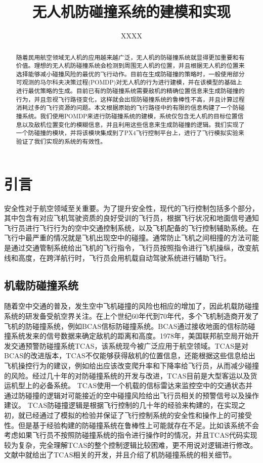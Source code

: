 \documentclass{article}
\title{无人机防碰撞系统的建模和实现}
\author{XXXX}
\begin{document}
\maketitle
\begin{abstract}
随着民用航空领域无人机的应用越来越广泛，无人机的防碰撞系统就显得更加重要和有价值。理想的无人机防碰撞系统会检测到周围无人机的位置，并且根据无人机的位置来选择能够减小碰撞风险的最优的飞行动作。目前在生成防碰撞的策略时，一般使用部分可观测的马尔科夫决策过程(POMDP)对无人机的行为进行建模，并在该模型的基础上进行最优策略的生成。目前已有的防碰撞系统需要敌机的精确位置信息来生成防碰撞的行为，并且忽视飞行路径变化，这样就会出现防碰撞系统的鲁棒性不高，并且计算过程消耗过多的飞行资源的问题。本文根据原始的飞行路径中的有限的信息构建了一个防碰撞系统。我们使用POMDP来进行防碰撞系统的建模，系统仅包含无人机的目标位置信息以及敌机位置变化的模糊信息，并且利用这些信息来生成防碰撞的逻辑。我们实现了一个防碰撞的模块，并将该模块集成到了PX4飞行控制平台上，进行了飞行模拟实验来验证了我们实现的系统的有效性。
\end{abstract}


\section{引言}

安全性对于航空领域至关重要。为了提升安全性，现代的飞行控制包括多个部分，其中包含有对应飞机驾驶资质的良好受训的飞行员，根据飞行状况和地面信号通知飞行员进行飞行行为的空中交通控制系统，以及飞机配备的飞行控制辅助系统。在飞行中最严重的情况就是飞机出现空中的碰撞。通常防止飞机之间相撞的方法可能是通过交通管制系统给出飞机的飞行指令，飞行员按照指令进行飞机操纵，改变航线和高度，在跨洋航行时，飞行员会用机载自动驾驶系统进行辅助飞行。

\subsection{机载防碰撞系统}
随着空中交通的普及，发生空中飞机碰撞的风险也相应的增加了，因此机载防碰撞系统的研发备受航空界关注。在上个世纪60年代到70年代，多个飞机制造商开发了飞机的防碰撞系统，例如BCAS信标防碰撞系统。BCAS通过接收地面的信标防碰撞系统发来的信号数据来确定敌机的距离和高度。1978年，美国联邦航空局开始开发交通预警防碰撞系统TCAS\cite{9,10}，该系统现今被广泛应用于航空领域。TCAS是对BCAS的改进版本，TCAS不仅能够获得敌机的位置信息，还能根据这些信息给出飞机操控行为的建议，例如给出应该改变爬升率和下降率给飞行员，从而减少碰撞的风险。经过几十年的对防碰撞系统的开发与改进，TCAS目前是大型客运以及货运机型上的必备系统。
TCAS使用一个机载的信标雷达来监控空中的交通状态并通过防碰撞的逻辑对可能接近的空中碰撞风险给出飞行员相关的预警信号以及操作建议。 TCAS防碰撞逻辑是根据飞行控制的几十年的经验来构建的，在实现之初，就已经通过了模拟的检验并保证了飞行控制系统的安全性和操作上的可接受性。但是基于经验构建的防碰撞系统在鲁棒性上可能就存在不足。比如该系统不会考虑如果飞行员不按照防碰撞系统的指令进行操作时的情况，并且TCAS代码实现较为复杂，完全理解TCAS的整个控制逻辑比较困难，更不用说对逻辑进行修改。文献\cite{9}中就给出了TCAS相关的开发，并且介绍了机防碰撞系统的相关细节。
\end{document}
